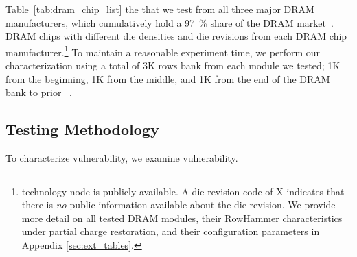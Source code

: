 {Table~\ref{tab:dram_chip_list}  the  that we test from all three major DRAM manufacturers, which cumulatively hold a \SI{97}{\percent} share of the DRAM market~\cite{statista2024marketshare}.}
{ DRAM chips with different die densities and die revisions from each DRAM chip manufacturer.}\footnote{ technology node is  publicly available. 
A die revision code of X indicates that there is \emph{no} public information available about the die revision. We provide more detail on all tested DRAM modules, their RowHammer characteristics under partial charge restoration, and their \X{} configuration parameters in Appendix \ref{sec:ext_tables}.
}
{To maintain a reasonable experiment time, we perform our characterization using a total of 3K rows  bank from each module we tested; 1K from the beginning, 1K from the middle, and 1K from the end of the DRAM bank to prior ~\cite{luo2023rowpress, yaglikci2022hira, kim2014flipping, orosa2021deeper, yaglikci2022understanding, olgun2023hbm, gao2022frac, gao2019computedram}}.


\subsection{Testing Methodology}
\label{subsec:testing_methodology}

{To characterize  vulnerability, we examine  vulnerability.}

